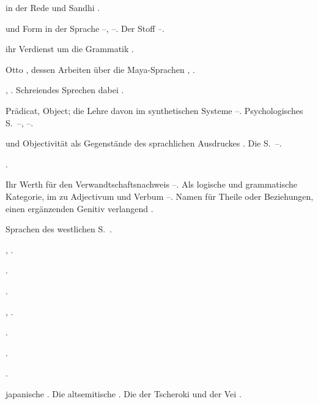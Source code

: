 \begin{register}
 in der Rede und Sandhi \pageref{sp.203}.

 und Form in der Sprache \pageref{sp.122}–\pageref{sp.123}, \pageref{sp.324}–\pageref{sp.360}. Der Stoff \pageref{sp.324}–\pageref{sp.327}.


 ihr Verdienst um die Grammatik \pageref{sp.20}.

 Otto \pageref{sp.31}, dessen Arbeiten über die Maya-Sprachen \pageref{sp.52}, \pageref{sp.257}.

 \pageref{sp.307}, \pageref{sp.310}. Schreiendes Sprechen dabei \pageref{sp.374}.


 Prädicat, Object; die Lehre davon im synthetischen Systeme \pageref{sp.101}–\pageref{sp.102}. Psychologisches S.~\pageref{sp.102}–\pageref{sp.103}, \pageref{sp.365}–\pageref{sp.373}.

 und Objectivität als Gegenstände des sprachlichen Ausdruckes \pageref{sp.438}. Die S.~\pageref{sp.472}–\pageref{sp.475}.

 \pageref{sp.104}.

 Ihr Werth für den Verwandtschaftsnachweis \pageref{sp.153}–\pageref{sp.154}. Als logische und grammatische Kategorie, im  zu Adjectivum und Verbum \pageref{sp.381}–\pageref{sp.385}. Namen für Theile oder Beziehungen, einen ergänzenden Genitiv verlangend \pageref{sp.441}.

 Sprachen des westlichen S.~\pageref{sp.150}.

 \pageref{sp.149}, \pageref{sp.349}.

 \pageref{sp.348}.

 \pageref{sp.147}.

 \pageref{sp.18}, \sed{\pageref{sp.294},} \pageref{sp.389}.


 \pageref{sp.103}.

 \pageref{sp.264}.

 \pageref{sp.150}.

 japanische \pageref{sp.130}. Die altsemitische \pageref{sp.131}. Die der Tscheroki und der Vei \pageref{sp.131}.


\end{register}
